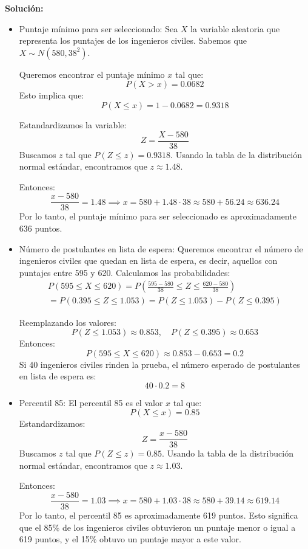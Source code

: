 \documentclass{article}
\begin{document}
\textbf{Solución:}
\begin{itemize}
  \item Puntaje mínimo para ser seleccionado:
  Sea \( X \) la variable aleatoria que representa los puntajes de los ingenieros civiles. Sabemos que \( X \sim N(580, 38^2) \).

  Queremos encontrar el puntaje mínimo \( x \) tal que:
  \[
  P(X > x) = 0.0682
  \]
  Esto implica que:
  \[
  P(X \leq x) = 1 - 0.0682 = 0.9318
  \]
  
  Estandardizamos la variable:
  \[
  Z = \frac{X - 580}{38}
  \]
  Buscamos \( z \) tal que \( P(Z \leq z) = 0.9318 \). Usando la tabla de la distribución normal estándar, encontramos que \( z \approx 1.48 \).

  Entonces:
  \[
  \frac{x - 580}{38} = 1.48 \implies x = 580 + 1.48 \cdot 38 \approx 580 + 56.24 \approx 636.24
  \]
  Por lo tanto, el puntaje mínimo para ser seleccionado es aproximadamente 636 puntos. 

  \item Número de postulantes en lista de espera:
  Queremos encontrar el número de ingenieros civiles que quedan en lista de espera, es decir, aquellos con puntajes entre 595 y 620.
  Calculamos las probabilidades:
  \begin{align*}
  P(595 \leq X \leq 620) = P\left(\frac{595 - 580}{38} \leq Z \leq \frac{620 - 580}{38}\right) \\ = P(0.395 \leq Z \le 1.053) = P(Z \leq 1.053) - P(Z \leq 0.395)
  \end{align*}

  Reemplazando los valores:
  \[
  P(Z \leq 1.053) \approx 0.853, \quad P(Z \leq 0.395) \approx 0.653
  \]
  Entonces:
  \[
  P(595 \leq X \leq 620) \approx 0.853 - 0.653 = 0.2
  \]
  Si 40 ingenieros civiles rinden la prueba, el   número esperado de postulantes en lista de espera es:
  \[
  40 \cdot 0.2 = 8
  \]

  \item Percentil 85:
  El percentil 85 es el valor \( x \) tal que:
  \[
  P(X \leq x) = 0.85
  \]
  Estandardizamos:
  \[
  Z = \frac{x - 580}{38}
  \]
  Buscamos \( z \) tal que \( P(Z \leq z) = 0.85 \). Usando la tabla de la distribución normal estándar, encontramos que \( z \approx 1.03 \).

  Entonces:
  \[
  \frac{x - 580}{38} = 1.03 \implies x = 580 + 1.03 \cdot 38 \approx 580 + 39.14 \approx 619.14
  \]
  Por lo tanto, el percentil 85 es aproximadamente 619 puntos. Esto significa que el 85\% de los ingenieros civiles obtuvieron un puntaje menor o igual a 619 puntos, y el 15\% obtuvo un puntaje mayor a este valor.
\end{itemize}
\end{document}

